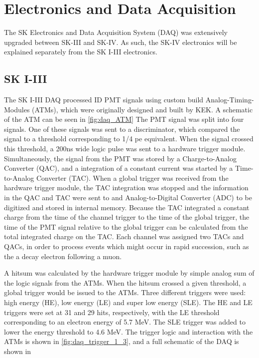 \section{Electronics and Data Acquisition}
\label{sec:daq}
The SK Electronics and Data Acquisition System (DAQ) was extensively upgraded between SK-III and SK-IV.  As such, the SK-IV electronics will be explained separately from the SK I-III electronics.
\subsection{SK I-III}
\label{subsec:sk_1_3_daq}
The SK I-III DAQ processed ID PMT signals using custom build Analog-Timing-Modules (ATMs), which were originally designed and built by KEK.   A schematic of the ATM can be seen in \cref{fig:daq_ATM}  The PMT signal was split into four signals.  One of these signals was sent to a discriminator, which compared the signal to a threshold corresponding to 1/4 pe equivalent.  When the signal crossed this threshold, a 200ns wide logic pulse was sent to a hardware trigger module.  Simultaneously, the signal from the PMT was stored by a Charge-to-Analog Converter (QAC), and a integration of a constant current was started by a Time-to-Analog Converter (TAC).  When a global trigger was received from the hardware trigger module, the TAC integration was stopped and the information in the QAC and TAC were sent to and Analog-to-Digital Converter (ADC) to be digitized and stored in internal memory.  Because the TAC integrated a constant charge from the time of the channel trigger to the time of the global trigger, the time of the PMT signal relative to the global trigger can be calculated from the total integrated charge on the TAC.  Each channel was assigned two TACs and QACs, in order to process events which might occur in rapid succession, such as the a decay electron following a muon.\par
A hitsum was calculated by the hardware trigger module by simple analog sum of the logic signals from the ATMs.  When the hitsum crossed a given threshold, a global trigger would be issued to the ATMs.  Three different triggers were used: high energy (HE), low energy (LE) and super low energy (SLE).  The HE and LE triggers were set at 31 and 29 hits, respectively, with the LE threshold corresponding to an electron energy of 5.7 MeV.  The SLE trigger was added to lower the energy threshold to 4.6 MeV.  The trigger logic and interaction with the ATMs is shown in \cref{fig:daq_trigger_1_3}, and a full schematic of the DAQ is shown in         

